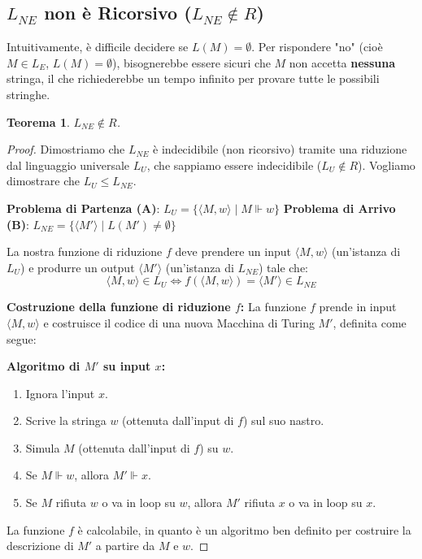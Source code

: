 \documentclass[a4paper]{article}
\newtheorem{theorem}{Teorema}[section] %
\begin{document}
\subsection{$L_{NE}$ non è Ricorsivo ($L_{NE} \notin R$)}

Intuitivamente, è difficile decidere se $L(M) = \emptyset$. Per rispondere "no" (cioè $M \in L_E$, $L(M) = \emptyset$), bisognerebbe essere sicuri che $M$ non accetta \textbf{nessuna} stringa, il che richiederebbe un tempo infinito per provare tutte le possibili stringhe.

\begin{theorem}
$L_{NE} \notin R$.
\end{theorem}
\begin{proof}
Dimostriamo che $L_{NE}$ è indecidibile (non ricorsivo) tramite una riduzione dal linguaggio universale $L_U$, che sappiamo essere indecidibile ($L_U \notin R$).
Vogliamo dimostrare che $L_U \le L_{NE}$.

\textbf{Problema di Partenza (A)}: $L_U = \{ \langle M, w \rangle \mid M \Vdash w \}$
\textbf{Problema di Arrivo (B)}: $L_{NE} = \{ \langle M' \rangle \mid L(M') \neq \emptyset \}$

La nostra funzione di riduzione $f$ deve prendere un input $\langle M, w \rangle$ (un'istanza di $L_U$) e produrre un output $\langle M' \rangle$ (un'istanza di $L_{NE}$) tale che:
\[
\langle M, w \rangle \in L_U \iff f(\langle M, w \rangle) = \langle M' \rangle \in L_{NE}
\]

\textbf{Costruzione della funzione di riduzione $f$:}
La funzione $f$ prende in input $\langle M, w \rangle$ e costruisce il codice di una nuova Macchina di Turing $M'$, definita come segue:

\textbf{Algoritmo di $M'$ su input $x$:}
\begin{enumerate}
    \item Ignora l'input $x$.
    \item Scrive la stringa $w$ (ottenuta dall'input di $f$) sul suo nastro.
    \item Simula $M$ (ottenuta dall'input di $f$) su $w$.
    \item Se $M \Vdash w$, allora $M' \Vdash x$.
    \item Se $M$ rifiuta $w$ o va in loop su $w$, allora $M'$ rifiuta $x$ o va in loop su $x$.
\end{enumerate}

La funzione $f$ è calcolabile, in quanto è un algoritmo ben definito per costruire la descrizione di $M'$ a partire da $M$ e $w$.


\end{proof}
\end{document}
